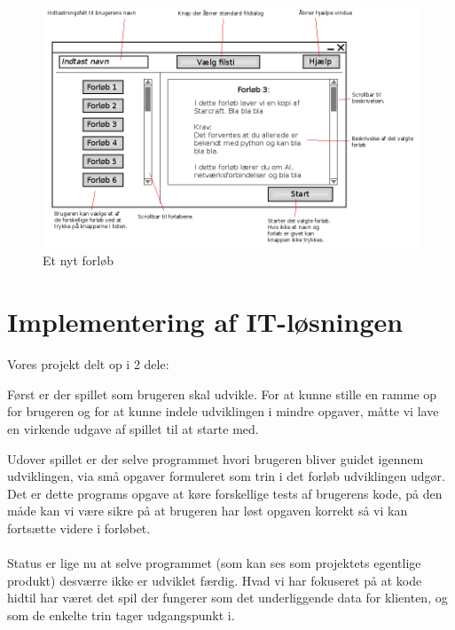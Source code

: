 \documentclass[10pt,a4paper,danish]{article}
\begin{document}
\begin{figure}[h]
  \begin{center}
    \includegraphics[scale=0.4]{nytforloeb.png}
    \caption{Et nyt forløb}
    \label{fig:nytforloeb}
  \end{center}
\end{figure}
\newpage

\section{Implementering af IT-løsningen}
Vores projekt delt op i 2 dele:

Først er der spillet som brugeren skal udvikle. 
For at kunne stille en ramme op for brugeren og for at kunne indele udviklingen i mindre opgaver, måtte vi lave en virkende udgave af spillet til at starte med.

Udover spillet er der selve programmet hvori brugeren bliver guidet igennem udviklingen, via små opgaver formuleret som trin i det forløb udviklingen udgør.
Det er dette programs opgave at køre forskellige tests af brugerens kode, på den måde kan vi være sikre på at brugeren har løst opgaven korrekt så vi kan fortsætte videre i forløbet.

\paragraph{}
Status er lige nu at selve programmet (som kan ses som projektets egentlige produkt) desværre ikke er udviklet færdig. Hvad vi har fokuseret på at kode hidtil har været det spil der fungerer som det underliggende data for klienten, og som de enkelte trin tager udgangspunkt i.
\end{document}
